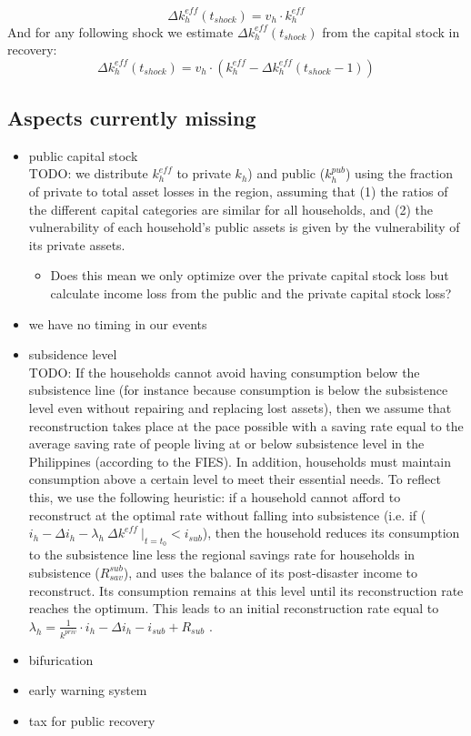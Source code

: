 \documentclass{article}
\begin{document}
\begin{equation}
\Delta k_h^{eff}(t_{shock}) = v_h \cdot k_h^{eff} 
\end{equation}
And for any following shock we estimate $\Delta k_h^{eff}(t_{shock})$ from the capital stock in recovery:
\begin{equation}
\Delta k_h^{eff}(t_{shock}) = v_h \cdot (k_h^{eff} -  \Delta k_h^{eff}(t_{shock} - 1))
\end{equation}
\subsection{Aspects currently missing}
\begin{itemize}
	\item public capital stock \\
	TODO: we distribute $k^{eff}_{h}$ to private $k_h$) and
	public ($k^{pub}_{h}$) using the fraction of private to total asset losses in the region, assuming that (1) the ratios of the different capital categories are similar for all households, and (2) the vulnerability of each household’s public assets is given by the vulnerability of
	its private assets. 
	\begin{itemize}
		\item Does this mean we only optimize over the private capital stock loss but calculate income loss from the public and the private capital stock loss?
	\end{itemize}
	\item we have no timing in our events
	\item subsidence level \\
	TODO:
	If the households cannot avoid having consumption below the subsistence line (for
	instance because consumption is below the subsistence level even without repairing
	and replacing lost assets), then we assume that reconstruction takes place at the pace
	possible with a saving rate equal to the average saving rate of people living at or
	below subsistence level in the Philippines (according to the FIES).
	In addition, households must maintain consumption above a certain level to meet
	their essential needs. To reflect this, we use the following heuristic: if a household
	cannot afford to reconstruct at the optimal rate without falling into subsistence (i.e.
	if ($i_h − \Delta i_h − \lambda_h \  \Delta k^{eff}\ \Biggr|_{t=t_0} < i_{sub}$), then the household reduces its consumption to the subsistence line less the regional savings rate for households in subsistence ($R^{sub}_{sav}$), and uses the balance of its post-disaster income to reconstruct. Its consumption remains at this level until its reconstruction rate reaches the optimum. This leads to an
	initial reconstruction rate equal to $ \lambda_h = \frac{1}{k^{priv}}\cdot  i_h − \Delta i_h − i_{sub} + R_{sub}$
	.
	\item bifurication
	\item early warning system
	\item tax for public recovery
	
\end{itemize}
\end{document}
